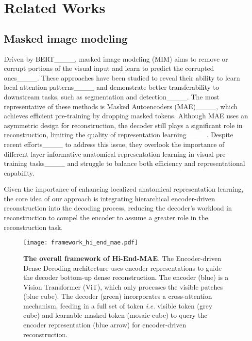 \section{Related Works}
\subsection{Masked image modeling}
Driven by BERT____, masked image modeling (MIM) aims to remove or corrupt portions of the visual input and learn to predict the corrupted ones____. These approaches have been studied to reveal their ability to learn local attention patterns____ and demonstrate better transferability to downstream tasks, such as segmentation and detection____. The most representative of these methods is Masked Autoencoders (MAE)____, which achieves efficient pre-training by dropping masked tokens. Although MAE uses an asymmetric design for reconstruction, the decoder still plays a significant role in reconstruction, limiting the quality of representation learning____. Despite recent efforts____ to address this issue, they overlook the importance of different layer informative anatomical representation learning in visual pre-training tasks____ and struggle to balance both efficiency and representational capability. 

Given the importance of enhancing localized anatomical representation learning, the core idea of our approach is integrating hierarchical encoder-driven reconstruction into the decoding process, reducing the decoder's workload in reconstruction to compel the encoder to assume a greater role in the reconstruction task.

\begin{figure*}[ht!]
    \centering
    \texttt{[image: framework\_hi\_end\_mae.pdf]}
    \vspace{-1mm}
    \caption{\textbf{The overall framework of Hi-End-MAE}. The Encoder-driven Dense Decoding architecture uses encoder representations to guide the decoder bottom-up dense reconstruction. The encoder (blue) is a Vision Transformer (ViT), which only processes the visible patches (blue cube). The decoder (green) incorporates a cross-attention mechanism, feeding in a full set of token \textit{i.e.} visible token (grey cube) and learnable masked token (mosaic cube) to query the encoder representation (blue arrow) for encoder-driven reconstruction.}
    \label{fig:framework}
    \vspace{-4mm}
\end{figure*}


